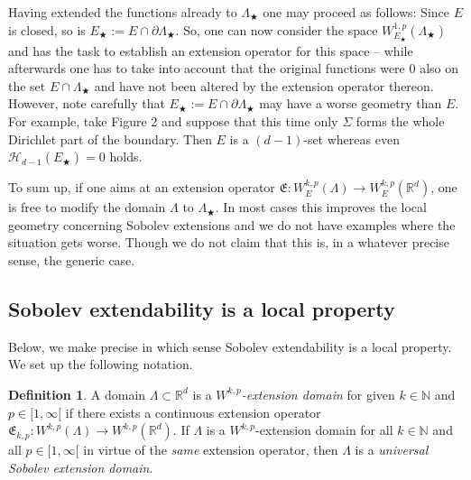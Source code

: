\documentclass[10pt,leqno]{amsart}
\theoremstyle{definition}
\newtheorem{definition}[theorem]{Definition}
\numberwithin{equation}{section}
\begin{document}
Having extended the functions already to $\Lambda_\bigstar$ one may proceed
as follows: Since $E$ is closed, so is $E_\bigstar := E \cap \partial
\Lambda_\bigstar$. So, one can now consider the space
$W^{1,p}_{E_\bigstar}(\Lambda_\bigstar)$ and has the task to establish an
extension operator for this space -- while afterwards one has to take into
account that the original functions were $0$ also on the set $E \cap
\Lambda_\bigstar$ and have not been altered by the extension operator
thereon. However, note carefully that $E_\bigstar := E \cap \partial
\Lambda_\bigstar$ may have a worse geometry than $E$. For example, take Figure 2
and suppose that this time only $\Sigma$ forms the whole Dirichlet part of the
boundary. Then $E$ is a $(d-1)$-set whereas even ${\mathcal{H}}_{d-1}(E_\bigstar)=0$ holds.

To sum up, if one aims at an extension operator $\mathfrak E :
W^{k,p}_E(\Lambda) \to W^{k,p}_E({{\mathbb R}}^d)$, one is free to modify the domain
$\Lambda$ to $\Lambda_\bigstar$. In most cases this improves the local geometry
concerning Sobolev extensions and we do not have examples where the situation
gets worse. Though we do not claim that this is, in a whatever precise sense,
the generic case. 

\subsection{Sobolev extendability is a local property}\label{subsec:
extentability is local}
Below, we make precise in which sense Sobolev extendability is a local property.
We set up the following notation.

\begin{definition} \label{d-Sobolev extension domain}
A domain $\Lambda \subset {{\mathbb R}}^d$ is a \emph{$W^{k,p}$-extension domain} for given
$k \in {{\mathbb N}}$ and $p \in {[1,\infty[}$ if there exists a continuous extension
operator $\mathfrak{E}_{k,p}: W^{k,p}(\Lambda)\to W^{k,p}({{\mathbb R}}^d)$. If $\Lambda$
is a $W^{k,p}$-extension domain for all $k \in {{\mathbb N}}$ and all $p \in {[1,\infty[}$
in virtue of the \emph{same} extension operator, then $\Lambda$ is
a \emph{universal Sobolev extension domain}.
\end{definition}
\end{document}
